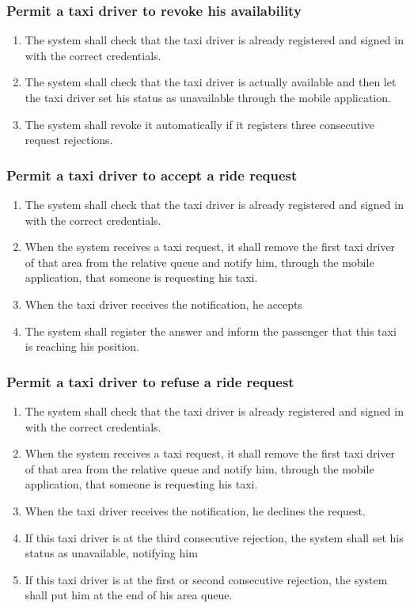 \subsubsection{Permit a taxi driver to revoke his availability}
\begin{enumerate}[label=\bfseries R\arabic*:]
	\item The system shall check that the taxi driver is already registered and signed in with
	the correct	credentials.
	\item The system shall check that the taxi driver is actually available and then
	let the taxi driver set his status as unavailable through the mobile application.
	\item The system shall revoke it automatically if it registers three consecutive request
	rejections.
\end{enumerate}
\subsubsection{Permit a taxi driver to accept a ride request}
\begin{enumerate}[label=\bfseries R\arabic*:]
	\item The system shall check that the taxi driver is already registered and signed in with
	the correct	credentials.
	\item When the system receives a taxi request, it shall remove the first taxi driver
	of that area from the relative queue and notify him, through the mobile application,
	that someone is requesting his taxi.
	\item When the taxi driver receives the notification, he accepts
	\item The system shall register the answer and inform the passenger
	that this taxi is reaching his position.
\end{enumerate}
\subsubsection{Permit a taxi driver to refuse a ride request}
\begin{enumerate}[label=\bfseries R\arabic*:]
	\item The system shall check that the taxi driver is already registered and signed in with
	the correct	credentials.
	\item When the system receives a taxi request, it shall remove the first taxi driver
	of that area from the relative queue and notify him, through the mobile application,
	that someone is requesting his taxi.
	\item When the taxi driver receives the notification, he declines the request.
	\item If this taxi driver is at the third consecutive rejection, the system shall set his status as unavailable,
	notifying him
	\item If this taxi driver is at the first or second consecutive rejection, the system shall put him
	at the end of his area queue.
\end{enumerate}
